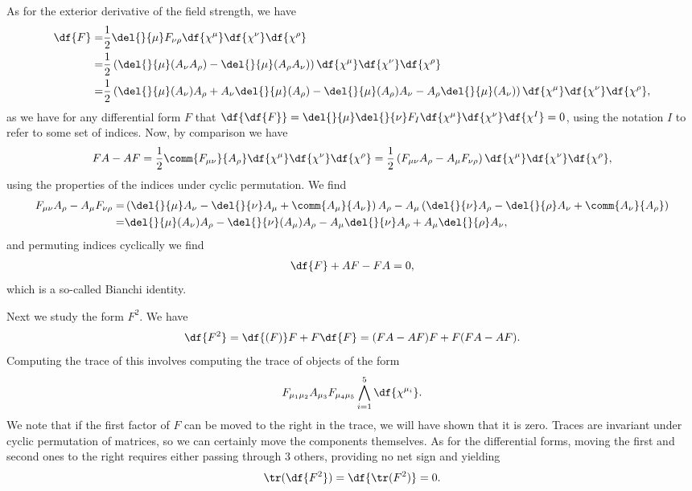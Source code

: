 As for the exterior derivative of the field strength, we have
\begin{align*}
	\df{F} =& \frac{1}{2}\del{}{\mu}F_{\nu\rho}\df{\chi^{\mu}}\df{\chi^{\nu}}\df{\chi^{\rho}} \\
	=& \frac{1}{2}\left(\del{}{\mu}(A_{\nu}A_{\rho}) - \del{}{\mu}(A_{\rho}A_{\nu})\right)\df{\chi^{\mu}}\df{\chi^{\nu}}\df{\chi^{\rho}} \\
	=& \frac{1}{2}\left(\del{}{\mu}(A_{\nu})A_{\rho} + A_{\nu}\del{}{\mu}(A_{\rho}) - \del{}{\mu}(A_{\rho})A_{\nu} - A_{\rho}\del{}{\mu}(A_{\nu})\right)\df{\chi^{\mu}}\df{\chi^{\nu}}\df{\chi^{\rho}},
\end{align*}
as we have for any differential form $F$ that $\df{\df{F}} = \del{}{\mu}\del{}{\nu}F_{I}\df{\chi^{\mu}}\df{\chi^{\nu}}\df{\chi^{I}} = 0$, using the notation $I$ to refer to some set of indices. Now, by comparison we have
\begin{align*}
	FA - AF = \frac{1}{2}\comm{F_{\mu\nu}}{A_{\rho}}\df{\chi^{\mu}}\df{\chi^{\nu}}\df{\chi^{\rho}} = \frac{1}{2}\left(F_{\mu\nu}A_{\rho} - A_{\mu}F_{\nu\rho}\right)\df{\chi^{\mu}}\df{\chi^{\nu}}\df{\chi^{\rho}},
\end{align*}
using the properties of the indices under cyclic permutation. We find
\begin{align*}
	F_{\mu\nu}A_{\rho} - A_{\mu}F_{\nu\rho} =& \left(\del{}{\mu}A_{\nu} - \del{}{\nu}A_{\mu} + \comm{A_{\mu}}{A_{\nu}}\right)A_{\rho} - A_{\mu}\left(\del{}{\nu}A_{\rho} - \del{}{\rho}A_{\nu} + \comm{A_{\nu}}{A_{\rho}}\right) \\
	=& \del{}{\mu}(A_{\nu})A_{\rho} - \del{}{\nu}(A_{\mu})A_{\rho} - A_{\mu}\del{}{\nu}A_{\rho} + A_{\mu}\del{}{\rho}A_{\nu},
\end{align*}
and permuting indices cyclically we find
\begin{align*}
	\df{F} + AF - FA = 0,
\end{align*}
which is a so-called Bianchi identity.

Next we study the form $F^{2}$. We have
\begin{align*}
	\df{F^{2}} = \df{(F)}F + F\df{F} = (FA - AF)F + F(FA - AF).
\end{align*}
Computing the trace of this involves computing the trace of objects of the form
\begin{align*}
	F_{\mu_{1}\mu_{2}}A_{\mu_{3}}F_{\mu_{4}\mu_{5}}\bigwedge\limits_{i = 1}^{5}\df{\chi^{\mu_{i}}}.
\end{align*}
We note that if the first factor of $F$ can be moved to the right in the trace, we will have shown that it is zero. Traces are invariant under cyclic permutation of matrices, so we can certainly move the components themselves. As for the differential forms, moving the first and second ones to the right requires either passing through $3$ others, providing no net sign and yielding
\begin{align*}
	\tr(\df{F^{2}}) = \df{\tr(F^{2})} = 0.
\end{align*}

